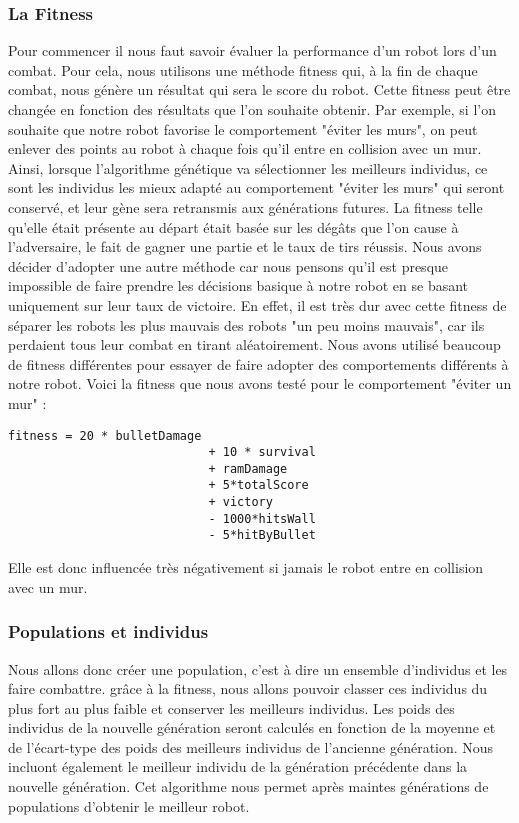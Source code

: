 \documentclass[12pt]{article}
\begin{document}
\subsubsection{La Fitness}
Pour commencer il nous faut savoir évaluer la performance d'un robot lors d'un combat. Pour cela, nous utilisons une méthode fitness qui, à la fin de chaque combat, nous génère un résultat qui sera le score du robot. Cette fitness peut être changée en fonction des résultats que l'on souhaite obtenir. Par exemple, si l'on souhaite que notre robot favorise le comportement "éviter les murs", on peut enlever des points au robot à chaque fois qu'il entre en collision avec un mur. Ainsi, lorsque l'algorithme génétique va sélectionner les meilleurs individus, ce sont les individus les mieux adapté au comportement "éviter les murs" qui seront conservé, et leur gène sera retransmis aux générations futures. La fitness telle qu'elle était présente au départ était basée sur les dégâts que l'on cause à l'adversaire, le fait de gagner une partie et le taux de tirs réussis. Nous avons décider d'adopter une autre méthode car nous pensons qu'il est presque impossible de faire prendre les décisions basique à notre robot en se basant uniquement sur leur taux de victoire. En effet, il est très dur avec cette fitness de séparer les robots les plus mauvais des robots "un peu moins mauvais", car ils perdaient tous leur combat en tirant aléatoirement.
Nous avons utilisé beaucoup de fitness différentes pour essayer de faire adopter des comportements différents à notre robot. Voici la fitness que nous avons testé pour le comportement "éviter un mur" : 

\begin{lstlisting}
fitness = 20 * bulletDamage
                            + 10 * survival
                            + ramDamage
                            + 5*totalScore
                            + victory
                            - 1000*hitsWall
                            - 5*hitByBullet
 \end{lstlisting}
 Elle est donc influencée très négativement si jamais le robot entre en collision avec un mur.

\subsubsection{Populations et individus}
Nous allons donc créer une population, c'est à dire un ensemble d'individus et les faire combattre. grâce à la fitness, nous allons pouvoir classer ces individus du plus fort au plus faible et conserver les meilleurs individus. Les poids des individus de la nouvelle génération seront calculés en fonction de la moyenne et de l'écart-type des poids des meilleurs individus de l'ancienne génération. Nous incluont également le meilleur individu de la génération précédente dans la nouvelle génération. Cet algorithme nous permet après maintes générations de populations d'obtenir le meilleur robot.
\end{document}
